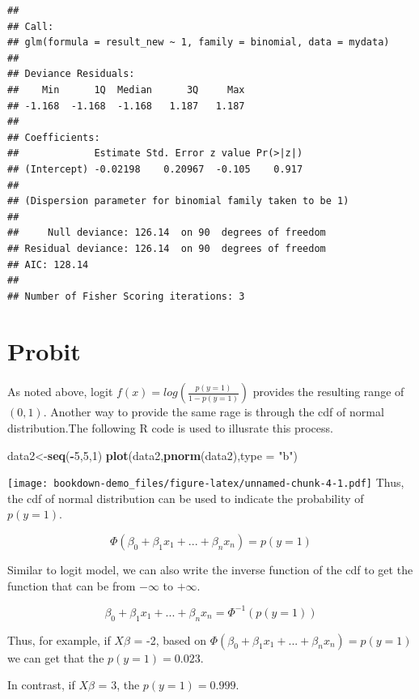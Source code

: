 \documentclass[]{book}
\newenvironment{Shaded}{\begin{snugshade}}{\end{snugshade}}
\newcommand{\DataTypeTok}[1]{\textcolor[rgb]{0.13,0.29,0.53}{#1}}
\newcommand{\DecValTok}[1]{\textcolor[rgb]{0.00,0.00,0.81}{#1}}
\newcommand{\KeywordTok}[1]{\textcolor[rgb]{0.13,0.29,0.53}{\textbf{#1}}}
\newcommand{\NormalTok}[1]{#1}
\newcommand{\OperatorTok}[1]{\textcolor[rgb]{0.81,0.36,0.00}{\textbf{#1}}}
\newcommand{\StringTok}[1]{\textcolor[rgb]{0.31,0.60,0.02}{#1}}
\begin{document}
\begin{verbatim}
## 
## Call:
## glm(formula = result_new ~ 1, family = binomial, data = mydata)
## 
## Deviance Residuals: 
##    Min      1Q  Median      3Q     Max  
## -1.168  -1.168  -1.168   1.187   1.187  
## 
## Coefficients:
##             Estimate Std. Error z value Pr(>|z|)
## (Intercept) -0.02198    0.20967  -0.105    0.917
## 
## (Dispersion parameter for binomial family taken to be 1)
## 
##     Null deviance: 126.14  on 90  degrees of freedom
## Residual deviance: 126.14  on 90  degrees of freedom
## AIC: 128.14
## 
## Number of Fisher Scoring iterations: 3
\end{verbatim}

\hypertarget{probit}{%
\section{Probit}\label{probit}}

As noted above, logit \(f(x)=log(\frac{p(y=1)}{1-p(y=1)})\) provides the resulting range of \((0,1)\). Another way to provide the same rage is through the cdf of normal distribution.The following R code is used to illusrate this process.

\begin{Shaded}
\begin{Highlighting}[]
\NormalTok{data2<-}\KeywordTok{seq}\NormalTok{(}\OperatorTok{-}\DecValTok{5}\NormalTok{,}\DecValTok{5}\NormalTok{,}\DecValTok{1}\NormalTok{)}
\KeywordTok{plot}\NormalTok{(data2,}\KeywordTok{pnorm}\NormalTok{(data2),}\DataTypeTok{type =} \StringTok{"b"}\NormalTok{)}
\end{Highlighting}
\end{Shaded}

\texttt{[image: bookdown-demo\_files/figure-latex/unnamed-chunk-4-1.pdf]}
Thus, the cdf of normal distribution can be used to indicate the probability of \(p(y=1)\).

\[\Phi(\beta_0+\beta_1x_1+...+\beta_nx_n )= p(y=1)\]

Similar to logit model, we can also write the inverse function of the cdf to get the function that can be from \(-\infty\) to \(+\infty\).

\[\beta_0+\beta_1x_1+...+\beta_nx_n =\Phi^{-1}(p(y=1))\]

Thus, for example, if \(X\beta\) = -2, based on \(\Phi(\beta_0+\beta_1x_1+...+\beta_nx_n )= p(y=1)\) we can get that the \(p(y=1)=0.023\).

In contrast, if \(X\beta\) = 3, the \(p(y=1)=0.999\).
\end{document}
